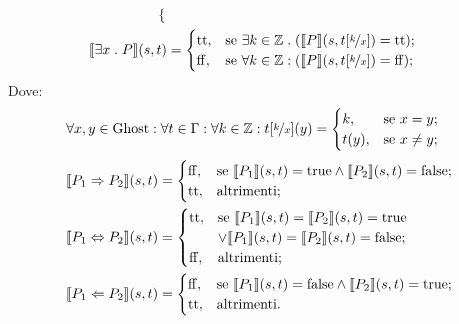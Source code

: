 \begin{definizione}
\begin{align*}
\begin{cases}
        \end{cases}\\
   \llbracket \exists x \mathrel{.} P\rrbracket(s,t)
      &=
        \begin{cases}
                \mathrm{tt},  &\text{se $\exists k\in \mathbb{Z}\mathrel{.}(\llbracket P\rrbracket(s,t[\nicefrac{k}{x}]) = \mathrm{tt}$});\\
                \mathrm{ff},  &\text{se $\forall k\in \mathbb{Z}\mathrel{:}(\llbracket P\rrbracket(s,t[\nicefrac{k}{x}]) = \mathrm{ff}$});
        \end{cases}
\end{align*}
Dove:
\begin{align*}
   \forall x,y\in\mathrm{Ghost}\mathrel{:}\forall t \in\Gamma\mathrel{:}\forall k\in\mathbb{Z} \mathrel{:} t[\nicefrac{k}{x}](y)
      &=
        \begin{cases}
                 k,   &\text{se $x = y$};\\
                 t(y),&\text{se $x  \neq  y$};
        \end{cases}
\end{align*}
\begin{align*}
    \llbracket P_1 \Rightarrow P_2 \rrbracket(s,t)
       &=
        \begin{cases}
            \mathrm{ff}, &\text{se $\llbracket P_1\rrbracket(s,t) = \mathrm{true} \land \llbracket P_2\rrbracket(s,t) = \mathrm{false}$};\\
            \mathrm{tt}, &\text{altrimenti};
        \end{cases}\\
    \llbracket P_1 \Leftrightarrow P_2\rrbracket(s,t)
       &=
        \begin{cases}
            \mathrm{tt},&\text{se $\llbracket P_1\rrbracket(s,t) = \llbracket P_2\rrbracket(s,t) = \mathrm{true}$}\\
                 &\text{$\lor\llbracket P_1\rrbracket(s,t) = \llbracket P_2 \rrbracket(s,t) = \mathrm{false}$};\\
            \mathrm{ff}, &\text{altrimenti};
        \end{cases}\\
   \llbracket P_1 \Leftarrow P_2\rrbracket(s,t)
      &=
        \begin{cases}
            \mathrm{ff},&\text{se $\llbracket P_1\rrbracket(s,t) = \mathrm{false} \land \llbracket P_2\rrbracket(s,t) = \mathrm{true}$};\\
            \mathrm{tt},&\text{altrimenti}.
   \end{cases}
\end{align*}
\end{definizione}

